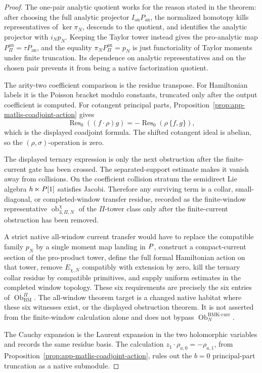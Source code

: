 \begin{proof}
  The one-pair analytic quotient works for the reason stated in the
  theorem: after choosing the full analytic projector \(I_{\mathrm{an}}
  P_{\mathrm{an}}\), the normalized homotopy kills representatives of
  \(\ker\pi_N\), descends to the quotient, and identifies the analytic
  projector with \(i_Np_N\).  Keeping the Taylor tower instead gives the
  pro-analytic map \(P_{\Pi}^{\mathrm{an}}=\tau P_{\mathrm{an}}\), and
  the equality \(\pi_NP_{\Pi}^{\mathrm{an}}=p_N\) is just functoriality
  of Taylor moments under finite truncation.  Its dependence on analytic
  representatives and on the chosen pair prevents it from being a native
  factorization quotient.

  The arity-two coefficient comparison is the residue transpose.  For
  Hamiltonian labels it is the Poisson bracket modulo constants,
  truncated only after the output coefficient is computed.  For cotangent
  principal parts, Proposition~\ref{prop:app-matlis-coadjoint-action}
  gives
  \[
    \operatorname{Res}_0((f\cdot\rho)g)
      =
      -\operatorname{Res}_0(\rho\,\{f,g\}),
  \]
  which is the displayed coadjoint formula.  The shifted cotangent ideal
  is abelian, so the \((\rho,\sigma)\)-operation is zero.

  The displayed ternary expression is only the next obstruction after the
  finite-current gate has been crossed.  The separated-support estimate
  makes it vanish away from collisions.  On the coefficient collision
  stratum the semidirect Lie algebra \(h\ltimes P[1]\)
  satisfies Jacobi.  Therefore any surviving term is a collar,
  small-diagonal, or completed-window transfer residue, recorded as the
  finite-window representative \(\operatorname{ob}^{\chi}_{3,\Pi,N}\)
  of the \(\Pi\)-tower class only after the finite-current
  obstruction has been removed.

  A strict native all-window current transfer would have to replace the
  compatible family \(p_N\) by a single moment map landing in
  \(P\), construct a compact-current section of the pro-product
  tower, define the full formal Hamiltonian action on that tower, remove
  \(E_{\chi,N}\) compatibly with extension by zero, kill the ternary
  collar residue by compatible primitives, and supply uniform estimates
  in the completed window topology.  These six requirements are
  precisely the six entries of \(\operatorname{Ob}^{\Pi}_{\mathrm{BM}}\).
  The all-window theorem target is a changed native habitat where these
  six witnesses exist, or the displayed obstruction theorem.  It is not
  asserted from the finite-window calculation alone and does not bypass
  \(\operatorname{Ob}^{\mathrm{BMK\mbox{-}curr}}_N\).

  The Cauchy expansion is the Laurent expansion in the two holomorphic
  variables and records the same residue basis.  The calculation
  \(z_1\cdot\rho_{a,0}=-\rho_{a,1}\), from
  Proposition~\ref{prop:app-matlis-coadjoint-action}, rules out the
  \(b=0\) principal-part truncation as a native submodule.
\end{proof}

